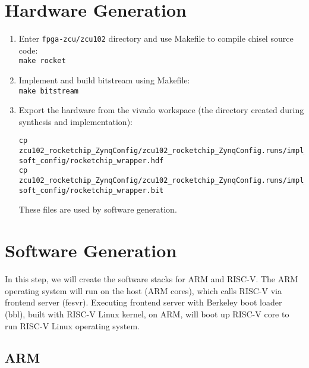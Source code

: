\documentclass[a4paper,11pt]{article}
\begin{document}
\section{Hardware Generation}
\begin{enumerate}
\item Enter  {\tt fpga-zcu/zcu102} directory and use Makefile to compile chisel source code:\\
{\tt make rocket}
\item Implement and build bitstream using Makefile:\\
 {\tt make bitstream}
 

\item Export the hardware from the vivado workspace (the directory created during synthesis and implementation):
\begin{lstlisting}
cp zcu102_rocketchip_ZynqConfig/zcu102_rocketchip_ZynqConfig.runs/impl_1/rocketchip_wrapper.sysdef soft_config/rocketchip_wrapper.hdf
cp zcu102_rocketchip_ZynqConfig/zcu102_rocketchip_ZynqConfig.runs/impl_1/rocketchip_wrapper.bit soft_config/rocketchip_wrapper.bit
\end{lstlisting}
These files are used by software generation.
\end{enumerate}

\section{Software Generation}
In this step, we will create the software stacks for ARM and RISC-V. The ARM operating system will run on the host (ARM cores), which calls RISC-V via frontend server (fesvr). Executing frontend server with Berkeley boot loader (bbl), built with RISC-V Linux kernel, on ARM, will boot up RISC-V core to run RISC-V Linux operating system.  

\subsection{ARM}\label{sec-arm}
\end{document}
